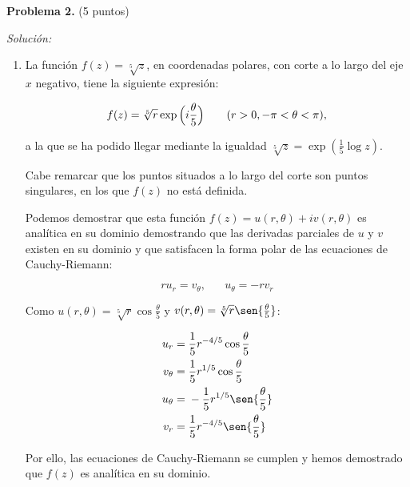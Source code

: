 \textbf{Problema 2.} (5 puntos)

\vspace{20px}
\textit{Solución:}
\\

\begin{enumerate}
[label=\alph*)]
    \item La función $f(z) = \sqrt[5]{z}$, en coordenadas polares, con corte a lo largo del eje $x$ negativo, tiene la siguiente expresión:

    \begin{equation*}
        f(z) = \sqrt[5]{r} \exp{\Bigl(i\frac{\theta}{5}\Bigl)} \hspace{20pt} (r > 0, -\pi < \theta < \pi),
    \end{equation*}

    a la que se ha podido llegar mediante la igualdad $\sqrt[5]{z} = \exp(\frac{1}{5} \log{z})$.

    Cabe remarcar que los puntos situados a lo largo del corte son
    puntos singulares, en los que $f(z)$ no está definida.

    Podemos demostrar que esta función $f(z) = u(r,\theta) + i v(r,\theta)$ es analítica
    en su dominio demostrando que las derivadas parciales de $u$ y $v$ existen en su dominio y que satisfacen la forma polar
    de las ecuaciones de Cauchy-Riemann:

    \begin{equation*}
        r u_r = v_\theta, \hspace{20pt} u_\theta = - r v_r
    \end{equation*}

    Como $u(r,\theta) = \sqrt[5]{r} \cos{\frac{\theta}{5}}$ y $v(r,\theta) = \sqrt[5]{r} \sen{\frac{\theta}{5}}$:

    \begin{align*}
        u_r  = & \;  \frac{1}{5} r^{-4/5} \cos{\frac{\theta}{5}} \\
        v_\theta  = & \;  \frac{1}{5} r^{1/5} \cos{\frac{\theta}{5}} \\
        u_\theta  = & \;  - \frac{1}{5} r^{1/5} \sen{\frac{\theta}{5}} \\
        v_r  = & \;  \frac{1}{5} r^{-4/5} \sen{\frac{\theta}{5}} \\
    \end{align*}

    Por ello, las ecuaciones de Cauchy-Riemann se cumplen y hemos demostrado que $f(z)$ es analítica en su dominio.



\end{enumerate}

